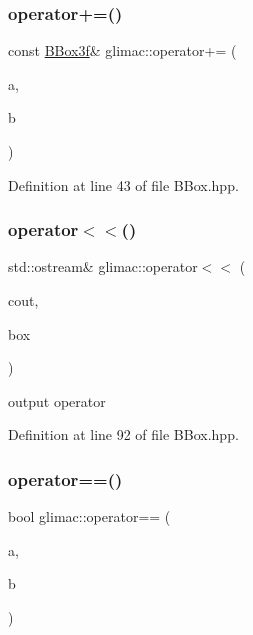 \subsubsection{\texorpdfstring{operator+=()}{operator+=()}\hspace{0.1cm}{\footnotesize\ttfamily [2/2]}}
{\footnotesize\ttfamily const \hyperlink{structglimac_1_1_b_box3f}{B\+Box3f}\& glimac\+::operator+= (\begin{DoxyParamCaption}\item[{\hyperlink{structglimac_1_1_b_box3f}{B\+Box3f} \&}]{a,  }\item[{const \hyperlink{group__core__types_ga1c47e8b3386109bc992b6c48e91b0be7}{glm\+::vec3} \&}]{b }\end{DoxyParamCaption})\hspace{0.3cm}{\ttfamily [inline]}}



Definition at line 43 of file B\+Box.\+hpp.

\mbox{\label{namespaceglimac_ac3d5f681d50fe823081cc206220115e6}} 
\subsubsection{\texorpdfstring{operator$<$$<$()}{operator<<()}}
{\footnotesize\ttfamily std\+::ostream\& glimac\+::operator$<$$<$ (\begin{DoxyParamCaption}\item[{std\+::ostream \&}]{cout,  }\item[{const \hyperlink{structglimac_1_1_b_box3f}{B\+Box3f} \&}]{box }\end{DoxyParamCaption})\hspace{0.3cm}{\ttfamily [inline]}}

output operator 

Definition at line 92 of file B\+Box.\+hpp.

\mbox{\label{namespaceglimac_a086462f9d14f3af4d2b3d00c9cf61d20}} 
\subsubsection{\texorpdfstring{operator==()}{operator==()}}
{\footnotesize\ttfamily bool glimac\+::operator== (\begin{DoxyParamCaption}\item[{const \hyperlink{structglimac_1_1_b_box3f}{B\+Box3f} \&}]{a,  }\item[{const \hyperlink{structglimac_1_1_b_box3f}{B\+Box3f} \&}]{b }\end{DoxyParamCaption})\hspace{0.3cm}{\ttfamily [inline]}}

